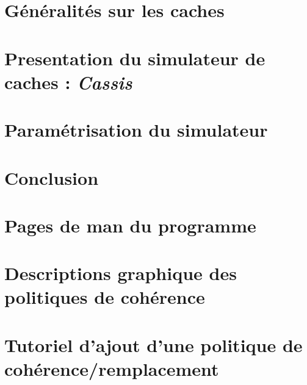 \documentclass[a4paper]{report}
\begin{document}


\newpage
\tableofcontents

\renewcommand{\labelitemi}{$\bullet$}

\newpage

\newpage
\chapter{Généralités sur les caches}

\newpage
\chapter{Presentation du simulateur de caches : \emph{Cassis}}

\newpage
\chapter{Paramétrisation du simulateur}

\newpage
\chapter*{Conclusion}

\newpage
\appendix
\chapter{Pages de man du programme}

\chapter{Descriptions graphique des politiques de cohérence}

\chapter{Tutoriel d'ajout d'une politique de cohérence/remplacement}

\nocite{*}


\end{document}
